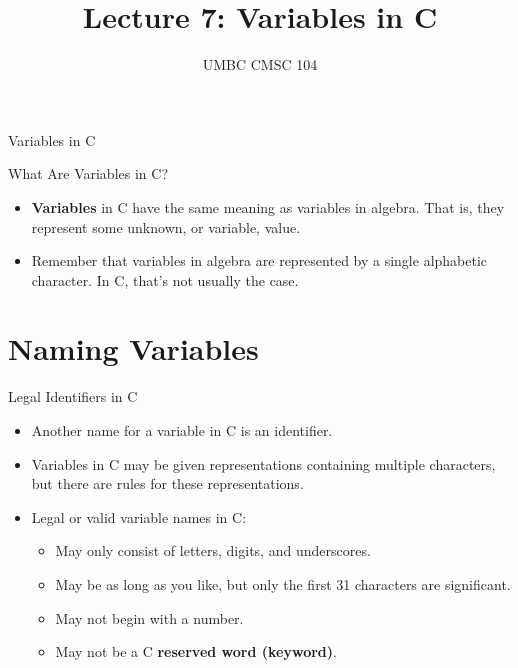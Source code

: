 \documentclass[graphics]{beamer}
\title{Lecture 7: Variables in C}
\author{UMBC CMSC 104}
\date{}
\begin{document}
\begin{frame}{}
\centering
    Variables in C
\end{frame}

\frame{\tableofcontents}

\begin{frame}{What Are Variables in C?}
    \begin{itemize}
        \item \textbf{Variables} in C have the same meaning as variables in algebra. That is, they represent some unknown, or variable, value. \\
        \item Remember that variables in algebra are represented by a single alphabetic character. In C, that's not usually the case.
    \end{itemize}
\end{frame}

\section{Naming Variables}
\begin{frame}{Legal Identifiers in C}
    \begin{itemize}
        \item Another name for a variable in C is an identifier.
        \item Variables in C may be given representations containing multiple characters, but there are rules for these representations.
        \item Legal or valid variable names in C:
        \begin{itemize}
            \item May only consist of letters, digits, and underscores.
            \item May be as long as you like, but only the first 31 characters are significant.
            \item May not begin with a number.
            \item May not be a C \textbf{reserved word (keyword)}.
        \end{itemize}
    \end{itemize}
\end{frame}
\end{document}
